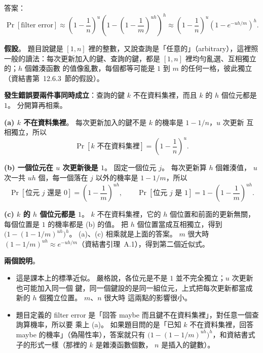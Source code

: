 \begin{pastsoln}
答案：
\[
\Pr[\text{filter error}] \approx \left(1 - \frac1n\right)^{u}
\left(1 - \left(1 - \frac1m\right)^{uh}\right)^{h}
\approx \left(1 - \frac1n\right)^{u} \left(1 - e^{-uh/m}\right)^{h}.
\]

\textbf{假設}。 題目說鍵是 $[1, n]$ 裡的整數，又說查詢是「任意的」（arbitrary），這裡照
一般的讀法：每次更新加入的鍵、查詢的鍵，都是 $[1, n]$ 裡均勻亂選、互相獨立的；$h$ 個雜湊函數
的值像亂數，每個都等可能是 $1$ 到 $m$ 的任何一格，彼此獨立（資結書第~12.6.3~節的假設）。

\textbf{發生錯誤要兩件事同時成立}：查詢的鍵 $k$ 不在資料集裡，而且 $k$ 的 $h$ 個位元都是 $1$。
分開算再相乘。

\textbf{(a) $k$ 不在資料集裡}。 每次更新加入的鍵不是 $k$ 的機率是 $1 - 1/n$，$u$ 次更新
互相獨立，所以
\[
\Pr[k \text{ 不在資料集裡}] = \left(1 - \frac1n\right)^{u}.
\]

\textbf{(b) 一個位元在 $u$ 次更新後是 $1$}。 固定一個位元 $j$。 每次更新算 $h$ 個雜湊值，
$u$ 次一共 $uh$ 個，每一個落在 $j$ 以外的機率是 $1 - 1/m$，所以
\[
\Pr[\text{位元 } j \text{ 還是 } 0] = \left(1 - \frac1m\right)^{uh}, \qquad
\Pr[\text{位元 } j \text{ 是 } 1] = 1 - \left(1 - \frac1m\right)^{uh}.
\]

\textbf{(c) $k$ 的 $h$ 個位元都是 $1$}。 $k$ 不在資料集裡，它的 $h$ 個位置和前面的更新無關，
每個位置是 $1$ 的機率都是 (b) 的值。 把 $h$ 個位置當成互相獨立，得到
$\bigl(1 - (1 - 1/m)^{uh}\bigr)^{h}$。 (a)、(c) 相乘就是上面的答案。 $m$ 很大時
$(1 - 1/m)^{uh} \approx e^{-uh/m}$（資結書引理~A.1），得到第二個近似式。

\textbf{兩個說明}。
\begin{itemize}
\item 這是課本上的標準近似。 嚴格說，各位元是不是 $1$ 並不完全獨立；$u$ 次更新也可能加入同一個
鍵，同一個鍵設的是同一組位元，上式把每次更新都當成新的 $h$ 個獨立位置。 $m$、$n$ 很大時
這兩點的影響很小。
\item 題目定義的 filter error 是「回答 maybe 而且鍵不在資料集裡」，對任意一個查詢算機率，所以要
乘上 (a)。 如果題目問的是「已知 $k$ 不在資料集裡，回答 maybe 的機率」（偽陽性率），答案就只有
$\bigl(1 - (1 - 1/m)^{uh}\bigr)^{h}$，和資結書式子的形式一樣（那裡的 $k$ 是雜湊函數個數，
$n$ 是插入的鍵數）。
\end{itemize}
\end{pastsoln}
